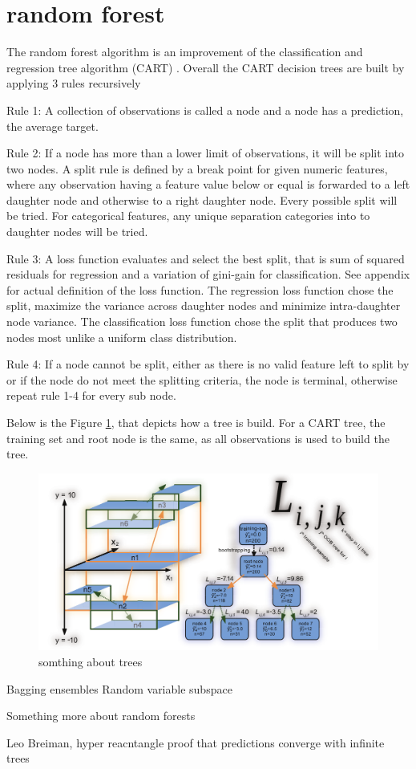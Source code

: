 \section{random forest}
The random forest algorithm is an improvement of the classification and regression tree algorithm (CART) \cite{breiman1984classification,breiman2001random}. Overall the CART decision trees are built by applying 3 rules recursively

Rule 1: A collection of observations is called a node and a node has a prediction, the average target.

Rule 2: If a node has more than a lower limit of observations, it will be split into two nodes. A split rule is defined by a break point for given numeric features, where any observation having a feature value below or equal is forwarded to a left daughter node and otherwise to a right daughter node. Every possible split will be tried. For categorical features, any unique separation categories into to daughter nodes will be tried.

Rule 3: A loss function evaluates and select the best split, that is sum of squared residuals for regression and a variation of gini-gain for classification. See appendix for actual definition of the loss function. The regression loss function chose the split, maximize the variance across daughter nodes and minimize intra-daughter node variance. The classification loss function chose the split that produces two nodes most unlike a uniform class distribution.

Rule 4: If a node cannot be split, either as there is no valid feature left to split by or if the node do not meet the splitting criteria, the node is terminal, otherwise repeat rule 1-4 for every sub node.

Below is the Figure \ref{simpleTree}, that depicts how a tree is build. For a CART tree, the training set and root node is the same, as all observations is used to build the tree.

\begin{figure}[!htbp]
\includegraphics[width=\textwidth,height=\textheight,keepaspectratio]{graphics/forestFloorFig02.pdf}
\caption{somthing about trees \cite{welling2016forest}}
\label{simpleTree}
\end{figure}

Bagging ensembles
Random variable subspace \cite{ho1998random}

Something more about random forests

Leo Breiman, hyper reacntangle proof that predictions converge with infinite trees
		     



